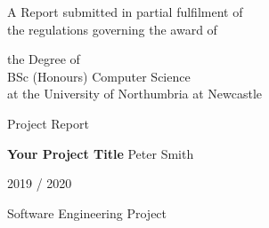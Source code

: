 
\begin{titlepage}
\Large
A Report submitted in partial fulfilment of\\
 the regulations governing the award of
\par
the Degree of\\[5mm]
{\huge	 BSc (Honours) Computer Science }\\[5mm]
at the University of Northumbria at Newcastle
\par
\vspace*{1in}
{\Large Project Report}
\par\vspace{1em}
{\Huge \bfseries Your Project Title}
\vfill
Peter Smith
\par\vspace{1em}
2019 / 2020
\par\vspace{1em}
Software Engineering Project
\end{titlepage}
